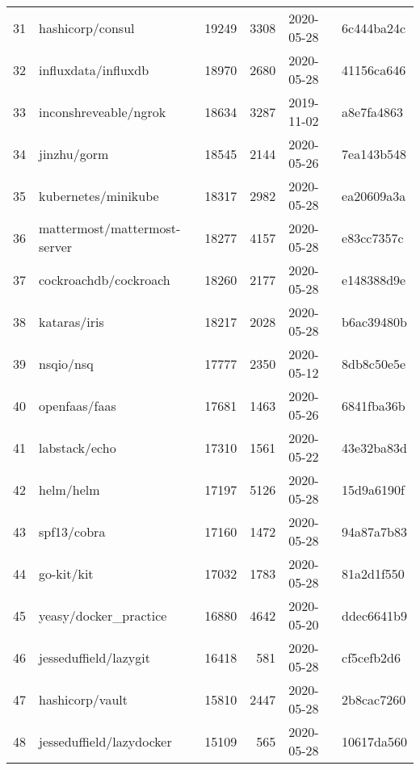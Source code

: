 \begin{longtable}{llrrll}
    31  &                                   hashicorp/consul &  19249 &   3308 & 2020-05-28 &  6c444ba24c \\
    32  &                                influxdata/influxdb &  18970 &   2680 & 2020-05-28 &  41156ca646 \\
    33  &                              inconshreveable/ngrok &  18634 &   3287 & 2019-11-02 &  a8e7fa4863 \\
    34  &                                        jinzhu/gorm &  18545 &   2144 & 2020-05-26 &  7ea143b548 \\
    35  &                                kubernetes/minikube &  18317 &   2982 & 2020-05-28 &  ea20609a3a \\
    36  &                       mattermost/mattermost-server &  18277 &   4157 & 2020-05-28 &  e83cc7357c \\
    37  &                              cockroachdb/cockroach &  18260 &   2177 & 2020-05-28 &  e148388d9e \\
    38  &                                       kataras/iris &  18217 &   2028 & 2020-05-28 &  b6ac39480b \\
    39  &                                          nsqio/nsq &  17777 &   2350 & 2020-05-12 &  8db8c50e5e \\
    40  &                                      openfaas/faas &  17681 &   1463 & 2020-05-26 &  6841fba36b \\
    41  &                                      labstack/echo &  17310 &   1561 & 2020-05-22 &  43e32ba83d \\
    42  &                                          helm/helm &  17197 &   5126 & 2020-05-28 &  15d9a6190f \\
    43  &                                        spf13/cobra &  17160 &   1472 & 2020-05-28 &  94a87a7b83 \\
    44  &                                         go-kit/kit &  17032 &   1783 & 2020-05-28 &  81a2d1f550 \\
    45  &                              yeasy/docker\_practice &  16880 &   4642 & 2020-05-20 &  ddec6641b9 \\
    46  &                              jesseduffield/lazygit &  16418 &    581 & 2020-05-28 &  cf5cefb2d6 \\
    47  &                                    hashicorp/vault &  15810 &   2447 & 2020-05-28 &  2b8cac7260 \\
    48  &                           jesseduffield/lazydocker &  15109 &    565 & 2020-05-28 &  10617da560 \\

\end{longtable}
